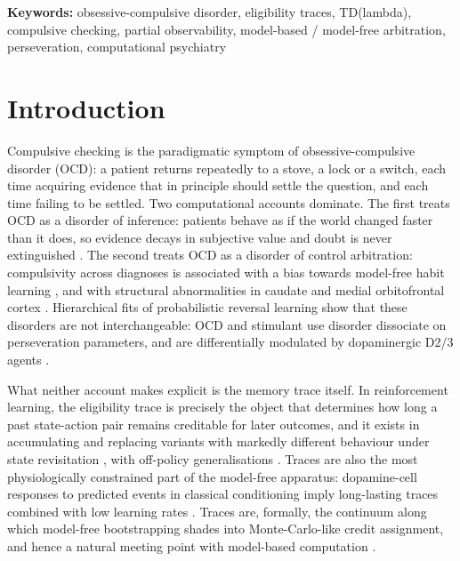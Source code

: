 \documentclass[11pt,a4paper]{article}
\begin{document}
\noindent\textbf{Keywords:} obsessive-compulsive disorder, eligibility traces, TD(lambda), compulsive checking, partial observability, model-based / model-free arbitration, perseveration, computational psychiatry

\medskip
\noindent{}

\section{Introduction}
Compulsive checking is the paradigmatic symptom of obsessive-compulsive disorder (OCD): a patient returns repeatedly to a stove, a lock or a switch, each time acquiring evidence that in principle should settle the question, and each time failing to be settled. Two computational accounts dominate. The first treats OCD as a disorder of inference: patients behave as if the world changed faster than it does, so evidence decays in subjective value and doubt is never extinguished \citep{fradkin2020searching}. The second treats OCD as a disorder of control arbitration: compulsivity across diagnoses is associated with a bias towards model-free habit learning \citep{voon2014disorders}, and with structural abnormalities in caudate and medial orbitofrontal cortex \citep{radua2009voxelwise}. Hierarchical fits of probabilistic reversal learning show that these disorders are not interchangeable: OCD and stimulant use disorder dissociate on perseveration parameters, and are differentially modulated by dopaminergic D2/3 agents \citep{kanen2019computational}.

What neither account makes explicit is the memory trace itself. In reinforcement learning, the eligibility trace is precisely the object that determines how long a past state-action pair remains creditable for later outcomes, and it exists in accumulating and replacing variants with markedly different behaviour under state revisitation \citep{singh1996reinforcement,kaelbling1996reinforcement}, with off-policy generalisations \citep{precup2000eligibility}. Traces are also the most physiologically constrained part of the model-free apparatus: dopamine-cell responses to predicted events in classical conditioning imply long-lasting traces combined with low learning rates \citep{pan2005dopamine}. Traces are, formally, the continuum along which model-free bootstrapping shades into Monte-Carlo-like credit assignment, and hence a natural meeting point with model-based computation \citep{moerland2023modelbased}.
\end{document}
